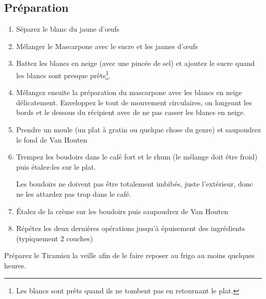 \subsection*{Préparation}
\begin{enumerate}
\item Séparez le blanc du jaune d'œufs
\item Mélanger le Mascarpone avec le sucre et les jaunes d'œufs
\item Battez les blancs en neige (avec une pincée de sel) et ajoutez le sucre quand les blancs sont presque prêts\footnote{Les blancs sont prêts quand ils ne tombent pas en retournant le plat.}.
\item Mélangez ensuite la préparation du mascarpone avec les blancs en neige délicatement. Enveloppez le tout de mouvement circulaires, on longeant les bords et le dessous du récipient avec de ne pas casser les blancs en neige.
\item Prendre un moule (un plat à gratin ou quelque chose du genre) et saupoudrez le fond de Van Houten
\item Trempez les boudoirs dans le café fort et le rhum (le mélange doit être froid) puis étalez-les sur le plat.
\begin{remarque}
Les boudoirs ne doivent pas être totalement imbibés, juste l'extérieur, donc ne les attardez pas trop dans le café.
\end{remarque}
\item Étalez de la crème sur les boudoirs puis saupoudrez de Van Houten
\item Répétez les deux dernières opérations jusqu'à épuisement des ingrédients (typiquement 2 couches)
\end{enumerate}

\begin{remarque}
Préparez le Tiramisu la veille afin de le faire reposer au frigo au moins quelques heures.
\end{remarque}